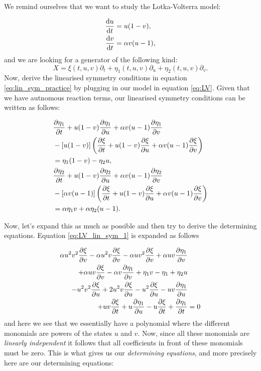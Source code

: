 We remind ourselves that we want to study the Lotka-Volterra model:

\begin{equation*}
  \begin{split}
    \dv{u}{t}&=u(1-v),\\
    \dv{v}{t}&=\alpha v(u-1),\\    
    \end{split}
\end{equation*}
and we are looking for a generator of the following kind:
\begin{equation}
X=\xi(t,u,v)\partial_t+\eta_1(t,u,v)\partial_u+\eta_2(t,u,v)\partial_v.
\end{equation}
Now, derive the linearised symmetry conditions in equation \eqref{eq:lin_sym_practice} by plugging in our model in equation \eqref{eq:LV}. Given that we have autnomous reaction terms, our linearised symmetry conditions can be written as follows:


\begin{align}
    &\pdv{\eta_1}{t}+u(1-v)\pdv{\eta_1}{u}+\alpha v(u-1)\pdv{\eta_1}{v}\nonumber\\
    &-\left[u(1-v)\right]\left(\pdv{\xi}{t}+u(1-v)\pdv{\xi}{u}+\alpha v(u-1)\pdv{\xi}{v}\right)\label{eq:LV_lin_sym_1}\\
    &=\eta_1(1-v)-\eta_2 u,\nonumber\\
    &\pdv{\eta_2}{t}+u(1-v)\pdv{\eta_2}{u}+\alpha v(u-1)\pdv{\eta_2}{v}\nonumber\\
    &-\left[\alpha v(u-1)\right]\left(\pdv{\xi}{t}+u(1-v)\pdv{\xi}{u}+\alpha v(u-1)\pdv{\xi}{v}\right)\label{eq:LV_lin_sym_2}\\
    &=\alpha\eta_1 v+\alpha\eta_2(u-1).\nonumber
\end{align}




Now, let's expand this as much as possible and then try to derive the determining equations. Equation \eqref{eq:LV_lin_sym_1} is expanded as follows



\begin{align}
  \alpha u^{2} v^{2} \pdv{\xi}{v}  - \alpha u^{2} v \pdv{\xi}{v} - \alpha u v^{2} \pdv{\xi}{v} + \alpha u v \pdv{\eta_1}{v}&\nonumber\\
  + \alpha u v \pdv{\xi}{v}  - \alpha v \pdv{\eta_1}{v}  + \eta_1 v - \eta_1 + \eta_2 u &\nonumber\\
  - u^{2} v^{2} \pdv{\xi}{u}  + 2 u^{2} v \pdv{\xi}{u}  - u^{2} \pdv{\xi}{u}  - u v \pdv{\eta_1}{u}&\label{eq:LV_lin_sym_1_expanded}\\
  + u v \pdv{\xi}{t}+ u \pdv{\eta_1}{u}  - u \pdv{\xi}{t}+ \pdv{\eta_1}{t}&=0\nonumber
\end{align}
and here we see that we essentially have a polynomial where the different monomials are powers of the states $u$ and $v$. Now, since all these monomials are \textit{linearly independent} it follows that all coefficients in front of these monomials must be zero. This is what gives us our \textit{determining equations}, and more precisely here are our determining equations:



